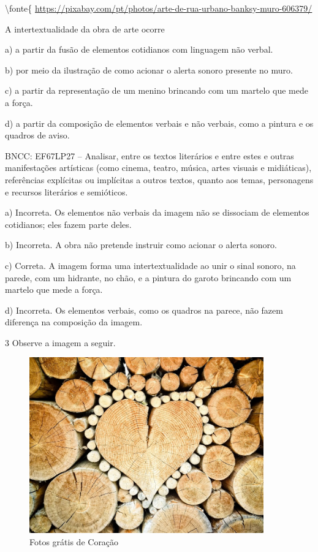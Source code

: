{\textbackslash fonte\{
\url{https://pixabay.com/pt/photos/arte-de-rua-urbano-banksy-muro-606379/}

A intertextualidade da obra de arte ocorre

a) a partir da fusão de elementos cotidianos com linguagem não verbal.

b) por meio da ilustração de como acionar o alerta sonoro presente no
muro.

c) a partir da representação de um menino brincando com um martelo que
mede a força.

d) a partir da composição de elementos verbais e não verbais, como a
pintura e os quadros de aviso.

BNCC: EF67LP27 -- Analisar, entre os textos literários e entre estes e
outras manifestações artísticas (como cinema, teatro, música, artes
visuais e midiáticas), referências explícitas ou implícitas a outros
textos, quanto aos temas, personagens e recursos literários e
semióticos.

a) Incorreta. Os elementos não verbais da imagem não se dissociam de
elementos cotidianos; eles fazem parte deles.

b) Incorreta. A obra não pretende instruir como acionar o alerta sonoro.

c) Correta. A imagem forma uma intertextualidade ao unir o sinal sonoro,
na parede, com um hidrante, no chão, e a pintura do garoto brincando com
um martelo que mede a força.

d) Incorreta. Os elementos verbais, como os quadros na parece, não fazem
diferença na composição da imagem.

\num{3} Observe a imagem a seguir.

\begin{figure}
\centering
\includegraphics[width=3.97917in,height=2.98438in]{./imgSAEB_6_POR/media/image14.jpeg}
\caption{Fotos grátis de Coração}
\end{figure}

}
